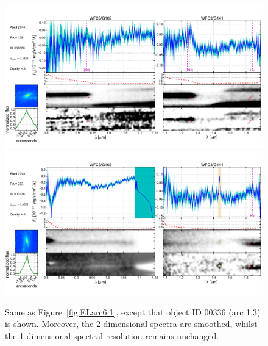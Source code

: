 \begin{figure}
    \centering
    \includegraphics[width=\textwidth]{fig/clA2744_id336_pa135_zsQ3.pdf}\\
    \includegraphics[width=\textwidth]{fig/clA2744_id336_pa233_zsQ3.pdf}
    \caption[Same as Figure~\ref{fig:ELarc6.1}, except that object ID 00336 (arc 1.3) is shown.]{Same as Figure~\ref{fig:ELarc6.1}, except that object ID 00336 (arc 1.3) is shown. Moreover, the 2-dimensional
  spectra are smoothed, whilst the 1-dimensional spectral resolution remains unchanged.}
    \label{fig:ELarc1.3}
\end{figure}

